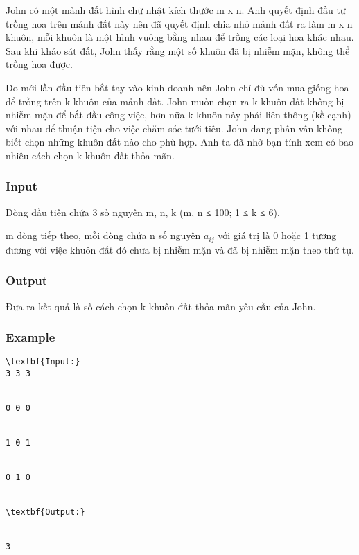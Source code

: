 



   John có một mảnh đất hình chữ nhật kích thước m x n. Anh quyết định đầu tư trồng hoa trên mảnh đất này nên đã quyết định chia nhỏ mảnh đất ra làm m x n khuôn, mỗi khuôn là một hình vuông bằng nhau để trồng các loại hoa khác nhau. Sau khi khảo sát đất, John thấy rằng một số khuôn đã bị nhiễm mặn, không thể trồng hoa được.  

   Do mới lần đầu tiên bắt tay vào kinh doanh nên John chỉ đủ vốn mua giống hoa để trồng trên k khuôn của mảnh đất. John muốn chọn ra k khuôn đất không bị nhiễm mặn để bắt đầu công việc, hơn nữa k khuôn này phải liên thông (kề cạnh) với nhau để thuận tiện cho việc chăm sóc tưới tiêu. John đang phân vân không biết chọn những khuôn đất nào cho phù hợp. Anh ta đã nhờ bạn tính xem có bao nhiêu cách chọn k khuôn đất thỏa mãn.  

\subsubsection{   Input  }

   Dòng đầu tiên chứa 3 số nguyên m, n, k (m, n ≤ 100; 1 ≤ k ≤ 6).  

   m dòng tiếp theo, mỗi dòng chứa n số nguyên $a_{ij}$   với giá trị là 0 hoặc 1 tương đương với việc khuôn đất đó chưa bị nhiễm mặn và đã bị nhiễm mặn theo thứ tự.  

\subsubsection{   Output  }

   Đưa ra kết quả là số cách chọn k khuôn đất thỏa mãn yêu cầu của John.  

\subsubsection{   Example  }
\begin{verbatim}
\textbf{Input:}
3 3 3


0 0 0


1 0 1


0 1 0


\textbf{Output:}


3
\end{verbatim}
